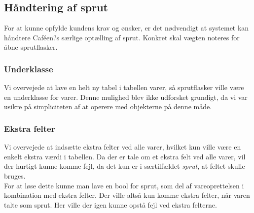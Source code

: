\documentclass[]{article}
\begin{document}
\subsection{Håndtering af sprut} \label{Sprut}
For at kunne opfylde kundens krav og ønsker, er det nødvendigt at systemet kan håndtere Caféen?s særlige optælling af sprut. Konkret skal vægten noteres for åbne sprutflasker.

\subsubsection{Underklasse}
\noindent Vi overvejede at lave en helt ny tabel i tabellen varer, så sprutflasker ville være en underklasse for varer. Denne mulighed blev ikke udforsket grundigt, da vi var usikre på simpliciteten af at operere med objekterne på denne måde.
%

\subsubsection{Ekstra felter}
\noindent Vi overvejede at indsætte ekstra felter ved alle varer, hvilket kun ville være en enkelt ekstra værdi i tabellen. Da der er tale om et ekstra felt ved alle varer, vil der hurtigt kunne komme fejl, da det kun er i særtilfældet \textit{sprut}, at feltet skulle bruges. \\
For at løse dette kunne man lave en bool for sprut, som del af vareoprettelsen i kombination med ekstra felter. Der ville altså kun komme ekstra felter, når varen talte som sprut. Her ville der igen kunne opstå fejl ved ekstra felterne.
\end{document}
